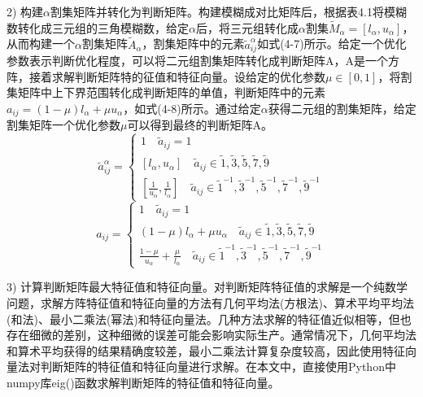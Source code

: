 2) 构建$\alpha$割集矩阵并转化为判断矩阵。构建模糊成对比矩阵后，根据表4.1将模糊数转化成三元组的三角模糊数，给定$\alpha$后，将三元组转化成$\alpha$割集$\widetilde{M}_{\alpha}=[l_{\alpha},u_{\alpha}]$，从而构建一个$\alpha$割集矩阵$\widetilde{A}_{\alpha}$，割集矩阵中的元素$\widetilde{a}_{ij}^{\alpha}$如式(4-7)所示。给定一个优化参数表示判断优化程度，可以将二元组割集矩阵转化成判断矩阵A，A是一个方阵，接着求解判断矩阵特的征值和特征向量。设给定的优化参数$\mu\in[0,1]$，将割集矩阵中上下界范围转化成判断矩阵的单值，判断矩阵中的元素$a_{ij}=(1-\mu)l_{\alpha}+\mu u_{\alpha}$，如式(4-8)所示。通过给定$\alpha$获得二元组的割集矩阵，给定割集矩阵一个优化参数$\mu$可以得到最终的判断矩阵A。
\begin{equation}
\widetilde{a}_{ij}^{\alpha} = \left\{\begin{array}{l}
1 \quad \widetilde{a}_{ij}=1 \\ [0.2cm]
[l_{\alpha},u_{\alpha}] \quad \widetilde{a}_{ij}\in{\widetilde{1},\widetilde{3},\widetilde{5},\widetilde{7},\widetilde{9}} \\ [0.2cm]
[\frac{1}{u_{\alpha}},\frac{1}{l_{\alpha}}] \quad \widetilde{a}_{ij}\in{\widetilde{1}^{-1},\widetilde{3}^{-1},\widetilde{5}^{-1},\widetilde{7}^{-1},\widetilde{9}^{-1}}
\end{array}\right.
\end{equation}
\begin{equation}
a_{ij} = \left\{\begin{array}{l}
1 \quad \widetilde{a}_{ij}=1 \\ [0.2cm]
(1-\mu)l_{\alpha}+\mu u_{\alpha} \quad \widetilde{a}_{ij}\in{\widetilde{1},\widetilde{3},\widetilde{5},\widetilde{7},\widetilde{9}} \\ [0.2cm]
\frac{1-\mu}{u_{\alpha}}+\frac{\mu}{l_{\alpha}} \quad \widetilde{a}_{ij}\in{\widetilde{1}^{-1},\widetilde{3}^{-1},\widetilde{5}^{-1},\widetilde{7}^{-1},\widetilde{9}^{-1}}
\end{array}\right.
\end{equation}

3) 计算判断矩阵最大特征值和特征向量。对判断矩阵特征值的求解是一个纯数学问题，求解方阵特征值和特征向量的方法有几何平均法(方根法)、算术平均平均法(和法)、最小二乘法(幂法)和特征向量法。几种方法求解的特征值近似相等，但也存在细微的差别，这种细微的误差可能会影响实际生产。通常情况下，几何平均法和算术平均获得的结果精确度较差，最小二乘法计算复杂度较高，因此使用特征向量法对判断矩阵的特征值和特征向量进行求解。在本文中，直接使用Python中numpy库eig()函数求解判断矩阵的特征值和特征向量。

